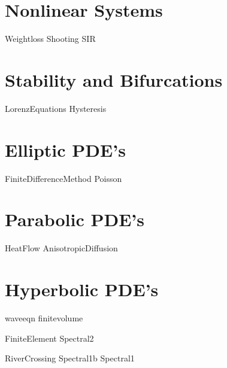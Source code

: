\documentclass[nociteref]{SIAM-GH-book}
\begin{document}
\part{Nonlinear Systems}
{Weightloss}
{Shooting}
{SIR}


\part{Stability and Bifurcations}
{LorenzEquations}
{Hysteresis}

\part{Elliptic PDE's}
 {FiniteDifferenceMethod}
 {Poisson}

\part{Parabolic PDE's}
{HeatFlow}
{AnisotropicDiffusion}


\part{Hyperbolic PDE's}
{waveeqn}
{finitevolume}


{FiniteElement}
{Spectral2}


{RiverCrossing}
{Spectral1b}
{Spectral1}

% 
% 
% 
% 
% 
% 
\end{document}
